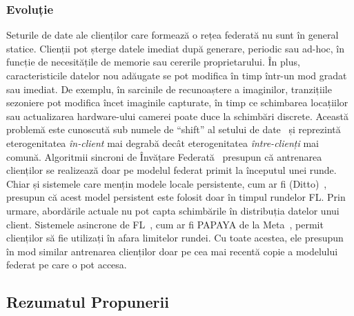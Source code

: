 \subsubsection{Evoluție}
Seturile de date ale clienților care formează o rețea federată nu sunt în general statice. Clienții pot șterge datele imediat după generare, periodic sau ad-hoc, în funcție de necesitățile de memorie sau cererile proprietarului. În plus, caracteristicile datelor nou adăugate se pot modifica în timp într-un mod gradat sau imediat. De exemplu, în sarcinile de recunoaștere a imaginilor, tranzițiile sezoniere pot modifica încet imaginile capturate, în timp ce schimbarea locațiilor sau actualizarea hardware-ului camerei poate duce la schimbări discrete. Această problemă este cunoscută sub numele de ``shift'' al setului de date~\citep[sec. 3.1]{AdvancedAndOpenProblems} și reprezintă eterogenitatea \emph{în-client} mai degrabă decât eterogenitatea \emph{între-clienți} mai comună. Algoritmii sincroni de Învățare Federată~\citep{FedAvg,FedOPT,QFedAvg} presupun că antrenarea clienților se realizează doar pe modelul federat primit la începutul unei runde. Chiar și sistemele care mențin modele locale persistente, cum ar fi (Ditto)~\citep{Ditto}, presupun că acest model persistent este folosit doar în timpul rundelor FL. Prin urmare, abordările actuale nu pot capta schimbările în distribuția datelor unui client. Sistemele asincrone de FL~\citep{AsynchronousFLonHetDevicesSurvey,FedBuff}, cum ar fi PAPAYA de la Meta~\citep{PAPAYA}, permit clienților să fie utilizați în afara limitelor rundei. Cu toate acestea, ele presupun în mod similar antrenarea clienților doar pe cea mai recentă copie a modelului federat pe care o pot accesa.

\subsection{Rezumatul Propunerii}

